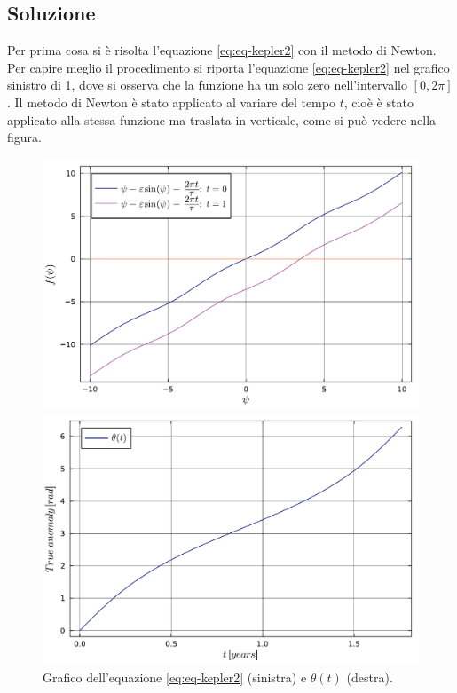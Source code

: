 \documentclass[letterpaper, 12pt]{article}
\numberwithin{equation}{section}    %
\begin{document}
\subsection{Soluzione}
Per prima cosa si è risolta l'equazione \ref{eq:eq-kepler2} con il metodo di Newton. Per capire meglio il 
procedimento si riporta l'equazione \ref{eq:eq-kepler2} nel grafico sinistro di \ref{fig:es3_3_4_1}, 
dove si osserva che 
la funzione ha un solo zero nell'intervallo $[0,2\pi]$. Il metodo di Newton è stato applicato al variare
del tempo $t$, cioè è stato applicato alla stessa funzione ma traslata in verticale, come si può vedere
nella figura. \\
\begin{figure}[!ht]
    \centering
    \begin{minipage}[b]{0.47\textwidth}
        \centering
        \includegraphics[width=\textwidth]{3341.pdf}
        \caption*{}
    \end{minipage}
    \hspace{0.5cm}
    \begin{minipage}[b]{0.47\textwidth}
        \centering
        \includegraphics[width=\textwidth]{3342.pdf}
        \caption*{}
    \end{minipage}
    \caption{Grafico dell'equazione \ref{eq:eq-kepler2} (sinistra) e $\theta(t)$ (destra).}
    \label{fig:es3_3_4_1}    
\end{figure}
\end{document}
